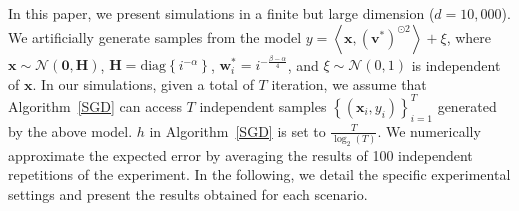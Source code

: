In this paper, we present simulations in a finite but large dimension ($d=10,000$). We artificially generate samples from the model $y=\left \langle \mathbf{x}, \left ( \mathbf{v}^* \right )^{\odot 2}  \right \rangle+\xi $, where $\mathbf{x}\sim \mathcal{N} \left ( \mathbf{0},\mathbf{H}   \right ) $, $\mathbf{H}=\mathrm{diag}\left \{ i^{-\alpha } \right \} $, $ \mathbf{w} ^*_i=i^{-\frac{\beta-\alpha }{4} }$, and $\xi\sim \mathcal{N} \left (0,1   \right )$ is independent of $\mathbf{x}$. In our simulations, given a total of $T$ iteration, we assume that Algorithm~\ref{SGD} can access $T$ independent samples $\left \{ \left ( \mathbf{x}_i,y_i  \right )  \right \} _{i=1}^T$ generated by the above model. $h$ in Algorithm~\ref{SGD} is set to $\frac{T}{\log_2(T)} $. We numerically approximate the expected error by averaging the results of 100 independent repetitions of the experiment.
In the following, we detail the specific experimental settings and present the results obtained for each scenario.
